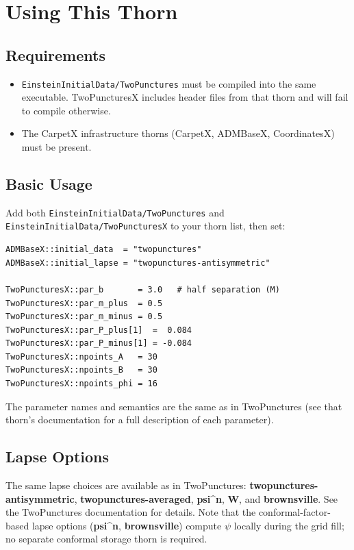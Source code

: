 \section{Using This Thorn}

\subsection{Requirements}

\begin{itemize}
  \item \texttt{EinsteinInitialData/TwoPunctures} must be compiled into the
    same executable.  TwoPuncturesX includes header files from that thorn and
    will fail to compile otherwise.
  \item The CarpetX infrastructure thorns (CarpetX, ADMBaseX, CoordinatesX)
    must be present.
\end{itemize}

\subsection{Basic Usage}

Add both \texttt{EinsteinInitialData/TwoPunctures} and
\texttt{EinsteinInitialData/TwoPuncturesX} to your thorn list, then set:

\begin{verbatim}
ADMBaseX::initial_data  = "twopunctures"
ADMBaseX::initial_lapse = "twopunctures-antisymmetric"

TwoPuncturesX::par_b       = 3.0   # half separation (M)
TwoPuncturesX::par_m_plus  = 0.5
TwoPuncturesX::par_m_minus = 0.5
TwoPuncturesX::par_P_plus[1]  =  0.084
TwoPuncturesX::par_P_minus[1] = -0.084
TwoPuncturesX::npoints_A   = 30
TwoPuncturesX::npoints_B   = 30
TwoPuncturesX::npoints_phi = 16
\end{verbatim}

The parameter names and semantics are the same as in TwoPunctures (see that
thorn's documentation for a full description of each parameter).

\subsection{Lapse Options}

The same lapse choices are available as in TwoPunctures:
\textbf{twopunctures-antisymmetric}, \textbf{twopunctures-averaged},
\textbf{psi\^{}n}, \textbf{W}, and \textbf{brownsville}.  See the TwoPunctures
documentation for details.  Note that the conformal-factor-based lapse options
(\textbf{psi\^{}n}, \textbf{brownsville}) compute $\psi$ locally during the
grid fill; no separate conformal storage thorn is required.

